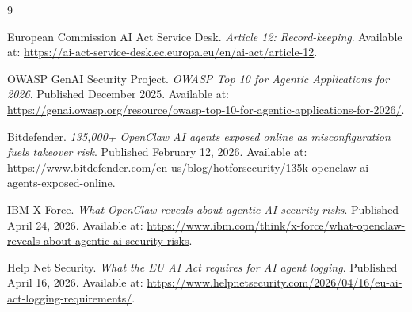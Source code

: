 \documentclass[11pt]{article}
\begin{document}
\begin{thebibliography}{9}

European Commission AI Act Service Desk.
\newblock \emph{Article 12: Record-keeping}.
\newblock Available at: \url{https://ai-act-service-desk.ec.europa.eu/en/ai-act/article-12}.

OWASP GenAI Security Project.
\newblock \emph{OWASP Top 10 for Agentic Applications for 2026}.
\newblock Published December 2025.
\newblock Available at: \url{https://genai.owasp.org/resource/owasp-top-10-for-agentic-applications-for-2026/}.

Bitdefender.
\newblock \emph{135,000+ OpenClaw AI agents exposed online as misconfiguration fuels takeover risk}.
\newblock Published February 12, 2026.
\newblock Available at: \url{https://www.bitdefender.com/en-us/blog/hotforsecurity/135k-openclaw-ai-agents-exposed-online}.

IBM X-Force.
\newblock \emph{What OpenClaw reveals about agentic AI security risks}.
\newblock Published April 24, 2026.
\newblock Available at: \url{https://www.ibm.com/think/x-force/what-openclaw-reveals-about-agentic-ai-security-risks}.

Help Net Security.
\newblock \emph{What the EU AI Act requires for AI agent logging}.
\newblock Published April 16, 2026.
\newblock Available at: \url{https://www.helpnetsecurity.com/2026/04/16/eu-ai-act-logging-requirements/}.

\end{thebibliography}
\end{document}
